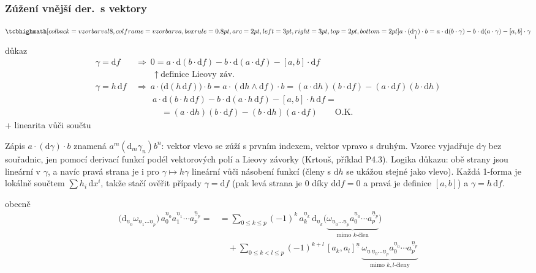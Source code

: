 \subsubsection*{Zúžení vnější der.\ s vektory}
\[
  \vzorec{a\cdot(\mathrm{d}\underset{1}{\gamma})\cdot b = a\cdot\mathrm{d}(b\cdot\gamma) - b\cdot\mathrm{d}(a\cdot\gamma) - [a,b]\cdot\gamma}
\]
důkaz
\begin{align*}
  \gamma = \mathrm{d}f \ &\Rightarrow\ 0 = a\cdot\mathrm{d}(b\cdot\mathrm{d}f) - b\cdot\mathrm{d}(a\cdot\mathrm{d}f) - [a,b]\cdot\mathrm{d}f \\
  &\qquad\ \uparrow\ \text{definice Lieovy záv.} \\
  \gamma = h\,\mathrm{d}f \ &\Rightarrow\ a\cdot\big(\mathrm{d}(h\,\mathrm{d}f)\big)\cdot b = a\cdot(\mathrm{d}h\wedge\mathrm{d}f)\cdot b
     = (a\cdot\mathrm{d}h)(b\cdot\mathrm{d}f) - (a\cdot\mathrm{d}f)(b\cdot\mathrm{d}h) \\
  &\qquad a\cdot\mathrm{d}(b\cdot h\,\mathrm{d}f) - b\cdot\mathrm{d}(a\cdot h\,\mathrm{d}f) - [a,b]\cdot h\,\mathrm{d}f = \\
  &\qquad\quad = (a\cdot\mathrm{d}h)(b\cdot\mathrm{d}f) - (b\cdot\mathrm{d}h)(a\cdot\mathrm{d}f) \qquad \text{O.K.}
\end{align*}
\quad + linearita vůči součtu

\begin{vysvetleni}
Zápis $a\cdot(\mathrm{d}\gamma)\cdot b$ znamená $a^m(\mathrm{d}_m\gamma_n)b^n$: vektor vlevo se zúží s prvním indexem, vektor vpravo s druhým. Vzorec vyjadřuje $\mathrm{d}\gamma$ bez souřadnic, jen pomocí derivací funkcí podél vektorových polí a Lieovy závorky (Krtouš, příklad P4.3).
Logika důkazu: obě strany jsou lineární v $\gamma$, a navíc pravá strana je i pro $\gamma\mapsto h\gamma$ lineární vůči násobení funkcí (členy s $\mathrm{d}h$ se ukážou stejné jako vlevo). Každá 1-forma je lokálně součtem $\sum h_i\,\mathrm{d}x^i$, takže stačí ověřit případy $\gamma=\mathrm{d}f$ (pak levá strana je $0$ díky $\mathrm{d}\mathrm{d}f=0$ a pravá je definice $[a,b]$) a $\gamma=h\,\mathrm{d}f$.
\end{vysvetleni}

obecně
\begin{align*}
  \big(\mathrm{d}_{\underline{n}_0}\omega_{\underline{n}_1\dots\underline{n}_p}\big)\,a_0^{\underline{n}_0}a_1^{\underline{n}_1}\cdots a_p^{\underline{n}_p} =
  &= \sum_{0\leq k\leq p}(-1)^k\,a_k^{\underline{n}_k}\,\mathrm{d}_{\underline{n}_k}\Big(\underbrace{\omega_{\underline{n}_0\dots\underline{n}_p}a_0^{\underline{n}_0}\cdots a_p^{\underline{n}_p}}_{\text{mimo } k\text{-člen}}\Big) \\
  &\quad + \sum_{0\leq k<l\leq p}(-1)^{k+l}\,[a_k,a_l]^{\underline{n}}\,\underbrace{\omega_{\underline{n}\,\underline{n}_0\dots\underline{n}_p}a_0^{\underline{n}_0}\cdots a_p^{\underline{n}_p}}_{\text{mimo } k,l\text{-členy}}
\end{align*}

